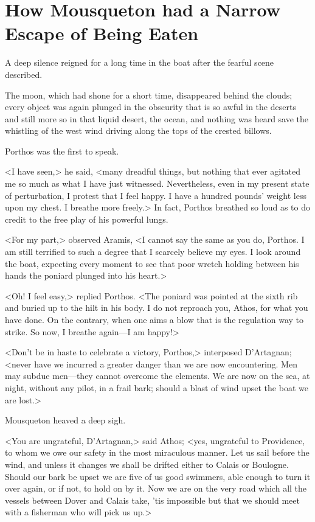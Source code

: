 \chapter[How Mousqueton had a Narrow Escape]{How Mousqueton had a Narrow Escape of Being Eaten}

 \lettrine{A}{} deep silence reigned for a long time in the boat after the fearful scene described.

\zz
The moon, which had shone for a short time, disappeared behind the clouds; every object was again plunged in the obscurity that is so awful in the deserts and still more so in that liquid desert, the ocean, and nothing was heard save the whistling of the west wind driving along the tops of the crested billows.

Porthos was the first to speak.

<I have seen,> he said, <many dreadful things, but nothing that ever agitated me so much as what I have just witnessed. Nevertheless, even in my present state of perturbation, I protest that I feel happy. I have a hundred pounds' weight less upon my chest. I breathe more freely.> In fact, Porthos breathed so loud as to do credit to the free play of his powerful lungs.

<For my part,> observed Aramis, <I cannot say the same as you do, Porthos. I am still terrified to such a degree that I scarcely believe my eyes. I look around the boat, expecting every moment to see that poor wretch holding between his hands the poniard plunged into his heart.>

<Oh! I feel easy,> replied Porthos. <The poniard was pointed at the sixth rib and buried up to the hilt in his body. I do not reproach you, Athos, for what you have done. On the contrary, when one aims a blow that is the regulation way to strike. So now, I breathe again—I am happy!>

<Don't be in haste to celebrate a victory, Porthos,> interposed D'Artagnan; <never have we incurred a greater danger than we are now encountering. Men may subdue men—they cannot overcome the elements. We are now on the sea, at night, without any pilot, in a frail bark; should a blast of wind upset the boat we are lost.>

Mousqueton heaved a deep sigh.

<You are ungrateful, D'Artagnan,> said Athos; <yes, ungrateful to Providence, to whom we owe our safety in the most miraculous manner. Let us sail before the wind, and unless it changes we shall be drifted either to Calais or Boulogne. Should our bark be upset we are five of us good swimmers, able enough to turn it over again, or if not, to hold on by it. Now we are on the very road which all the vessels between Dover and Calais take, 'tis impossible but that we should meet with a fisherman who will pick us up.>

